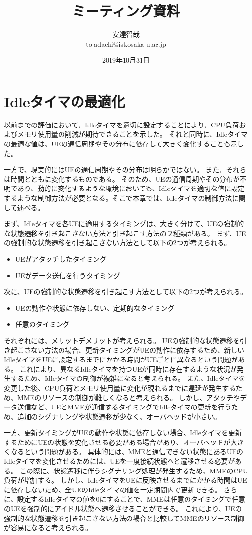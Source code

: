 \documentclass[a4j]{ujarticle}
\title{ミーティング資料}
\author{安達智哉\\to-adachi@ist.osaka-u.ac.jp}
\date{2019年10月31日}
\begin{document}
\maketitle



\section{Idleタイマの最適化}
以前までの評価において、Idleタイマを適切に設定することにより、CPU負荷およびメモリ使用量の削減が期待できることを示した。
それと同時に、Idleタイマの最適な値は、UEの通信周期やその分布に依存して大きく変化することも示した。

一方で、現実的にはUEの通信周期やその分布は明らかではない。
また、それらは時間とともに変化するものである。
そのため、UEの通信周期やその分布が不明であり、動的に変化するような環境においても、Idleタイマを適切な値に設定するような制御方法が必要となる。そこで本章では、Idleタイマの制御方法に関して述べる。

まず、Idleタイマを各UEに適用するタイミングは、大きく分けて、UEの強制的な状態遷移を引き起こさない方法と引き起こす方法の２種類がある。
まず、UEの強制的な状態遷移を引き起こさない方法として以下の2つが考えられる。
\begin{itemize}
  \item UEがアタッチしたタイミング
  \item UEがデータ送信を行うタイミング
\end{itemize}
次に、UEの強制的な状態遷移を引き起こす方法として以下の2つが考えられる。
\begin{itemize}
\item UEの動作や状態に依存しない、定期的なタイミング
\item 任意のタイミング
\end{itemize}

それぞれには、メリットデメリットが考えられる。
UEの強制的な状態遷移を引き起こさない方法の場合、更新タイミングがUEの動作に依存するため、新しいIdleタイマをUEに設定するまでにかかる時間がUEごとに異なるという問題がある。
これにより、異なるIdleタイマを持つUEが同時に存在するような状況が発生するため、Idleタイマの制御が複雑になると考えられる。
また、Idleタイマを変更した後、CPU負荷とメモリ使用量に変化が現れるまでに遅延が発生するため、MMEのリソースの制御が難しくなると考えられる。
しかし、アタッチやデータ送信など、UEとMMEが通信するタイミングでIdleタイマの更新を行うため、追加のシグナリングや状態遷移が少なく、オーバヘッドが小さい。

一方、更新タイミングがUEの動作や状態に依存しない場合、Idleタイマを更新するためにUEの状態を変化させる必要がある場合があり、オーバヘッドが大きくなるという問題がある。
具体的には、MMEと通信できない状態にあるUEのIdleタイマを変化させるためには、UEを一度接続状態へと遷移させる必要がある。
この際に、状態遷移に伴うシグナリング処理が発生するため、MMEのCPU負荷が増加する。
しかし、IdleタイマをUEに反映させるまでにかかる時間はUEに依存しないため、全UEのIdleタイマの値を一定期間内で更新できる。
さらに、設定するIdleタイマの値を0にすることで、MMEは任意のタイミングで任意のUEを強制的にアイドル状態へ遷移させることができる。
これにより、UEの強制的な状態遷移を引き起こさない方法の場合と比較してMMEのリソース制御が容易になると考えられる。
\end{document}
